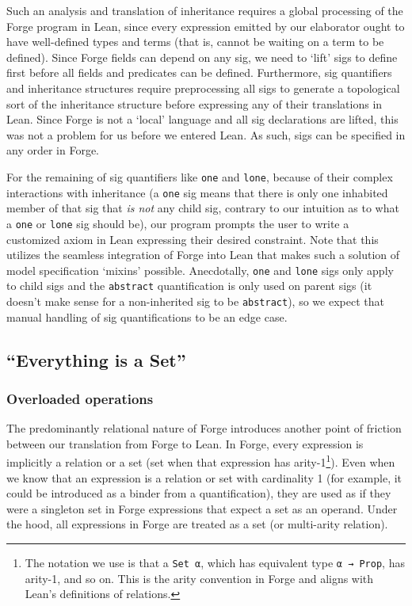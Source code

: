 
Such an analysis and translation of inheritance requires a global processing of the Forge program in Lean, since every expression emitted by our elaborator ought to have well-defined types and terms (that is, cannot be waiting on a term to be defined). Since Forge fields can depend on any sig, we need to `lift' sigs to define first before all fields and predicates can be defined. Furthermore, sig quantifiers and inheritance structures require preprocessing all sigs to generate a topological sort of the inheritance structure before expressing any of their translations in Lean. Since Forge is not a `local' language and all sig declarations are lifted, this was not a problem for us before we entered Lean. As such, sigs can be specified in any order in Forge. 

For the remaining of sig quantifiers like \texttt{one} and \texttt{lone}, because of their complex interactions with inheritance (a \texttt{one} sig means that there is only one inhabited member of that sig that \emph{is not} any child sig, contrary to our intuition as to what a \texttt{one} or \texttt{lone} sig should be), our program prompts the user to write a customized axiom in Lean expressing their desired constraint. Note that this utilizes the seamless integration of Forge into Lean that makes such a solution of model specification `mixins' possible. Anecdotally, \texttt{one} and \texttt{lone} sigs only apply to child sigs and the \texttt{abstract} quantification is only used on parent sigs (it doesn't make sense for a non-inherited sig to be \texttt{abstract}), so we expect that manual handling of sig quantifications to be an edge case. 

\subsection{``Everything is a Set''}\label{sec:everything-is-a-set}
\subsubsection{Overloaded operations}
The predominantly relational nature of Forge introduces another point of friction between our translation from Forge to Lean. In Forge, every expression is implicitly a relation or a set (set when that expression has arity-1\footnote{The notation we use is that a \texttt{Set α}, which has equivalent type \texttt{α → Prop}, has arity-1, and so on. This is the arity convention in Forge and aligns with Lean's definitions of relations.}). Even when we know that an expression is a relation or set with cardinality 1 (for example, it could be introduced as a binder from a quantification), they are used as if they were a singleton set in Forge expressions that expect a set as an operand. Under the hood, all expressions in Forge are treated as a set (or multi-arity relation). 

